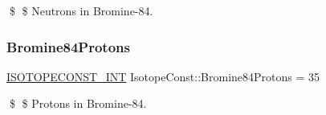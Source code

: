\$ \$ Neutrons in Bromine-\/84. \mbox{\label{group___isotope_const-_bromine-_br84_ga8e7e385c2941e8da47dcbcff4c143553}} 
\subsubsection{\texorpdfstring{Bromine84\+Protons}{Bromine84Protons}}
{\footnotesize\ttfamily \mbox{\hyperlink{group___isotope_const-_macros_ga5f18360b3e99483a35c32d789e62621c}{I\+S\+O\+T\+O\+P\+E\+C\+O\+N\+S\+T\+\_\+\+I\+NT}} Isotope\+Const\+::\+Bromine84\+Protons = 35}

\$ \$ Protons in Bromine-\/84. 